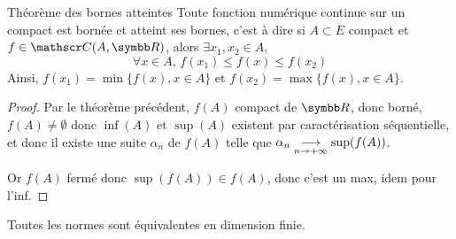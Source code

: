 \begin{theoreme}{Théorème des bornes atteintes}{}
    Toute fonction numérique continue sur un compact est bornée et atteint ses bornes, c'est à dire 
    si $A \subset E$ compact et $f \in \mathscr C(A, \R)$, alors 
    $\exists x_1, x_2 \in A$,
    \[\forall x \in A, \, f(x_1) \leqslant f(x) \leqslant f(x_2)\]
    Ainsi, $f(x_1) = \min \{ f(x), x \in A \}$ et $f(x_2) = \max \{ f(x), x \in A \}$.
\end{theoreme}


\begin{proof}
    Par le théorème précédent, $f(A)$ compact de $\R$, donc borné, $f(A) \neq \emptyset$ donc 
    $ \inf(A)$ et $\sup(A)$ existent par caractérisation séquentielle, et donc il existe une suite 
    $\alpha_n$ de $f(A)$ telle que $\alpha_n \underset{n \to + \infty}{\longrightarrow} \sup(f(A))$.

    Or $f(A)$ fermé donc $\sup(f(A)) \in f(A)$, donc c'est un max, idem pour l'inf. 
\end{proof}

\begin{theoreme}{}{}
    Toutes les normes sont équivalentes en dimension finie.
\end{theoreme}


